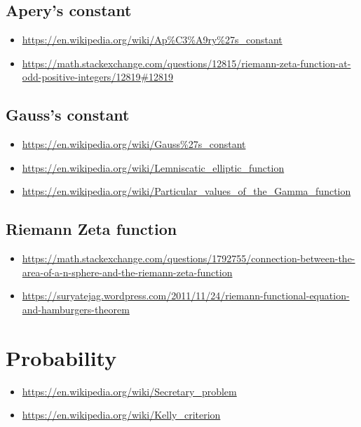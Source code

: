 \subsection{Apery's constant}
\begin{itemize}
\item \url{https://en.wikipedia.org/wiki/Ap%C3%A9ry%27s_constant}
\item \url{https://math.stackexchange.com/questions/12815/riemann-zeta-function-at-odd-positive-integers/12819#12819}
\end{itemize}

\subsection{Gauss's constant}
\begin{itemize}
\item \url{https://en.wikipedia.org/wiki/Gauss\%27s_constant}
\item \url{https://en.wikipedia.org/wiki/Lemniscatic_elliptic_function}
\item \url{https://en.wikipedia.org/wiki/Particular_values_of_the_Gamma_function}
\end{itemize}

\subsection{Riemann Zeta function}
\begin{itemize}
\item \url{https://math.stackexchange.com/questions/1792755/connection-between-the-area-of-a-n-sphere-and-the-riemann-zeta-function}
\item \url{https://suryatejag.wordpress.com/2011/11/24/riemann-functional-equation-and-hamburgers-theorem}
\end{itemize}


\section{Probability}
\begin{itemize}
\item \url{https://en.wikipedia.org/wiki/Secretary_problem}
\item \url{https://en.wikipedia.org/wiki/Kelly_criterion}
\end{itemize}

